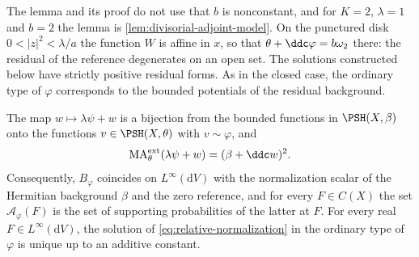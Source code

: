 The lemma and its proof do not use that $b$ is nonconstant, and for $K=2$, $\lambda=1$ and $b=2$ the lemma is \cref{lem:divisorial-adjoint-model}. On the punctured disk $0<|z|^2<\lambda/a$ the function $W$ is affine in $x$, so that $\theta+\ddc\varphi=b\omega_2$ there: the residual of the reference degenerates on an open set. The solutions constructed below have strictly positive residual forms. As in the closed case, the ordinary type of $\varphi$ corresponds to the bounded potentials of the residual background.

\begin{proposition}\label{prop:nongauduchon-residual-correspondence}
The map $w\mapsto\lambda\psi+w$ is a bijection from the bounded functions in $\PSH(X,\beta)$ onto the functions $v\in\PSH(X,\theta)$ with $v\sim\varphi$, and
\begin{equation}\label{eq:nongauduchon-residual-measure}
 \mathrm{MA}^{\mathrm{ext}}_\theta(\lambda\psi+w)=(\beta+\ddc w)^2.
\end{equation}
Consequently, $B_\varphi$ coincides on $L^\infty(\mathrm dV)$ with the normalization scalar of the Hermitian background $\beta$ and the zero reference, and for every $F\in C(X)$ the set $\mathcal A_\varphi(F)$ is the set of supporting probabilities of the latter at $F$. For every real $F\in L^\infty(\mathrm dV)$, the solution of \eqref{eq:relative-normalization} in the ordinary type of $\varphi$ is unique up to an additive constant.
\end{proposition}

